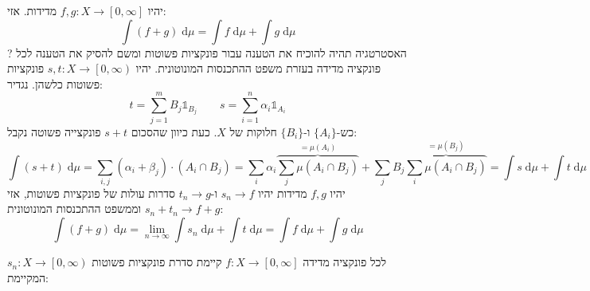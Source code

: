 \documentclass{tstextbook}
\begin{document}
\begin{lemma}
יהיו \(f,g:X\to\left[ 0,\infty \right]\) מדידות. אזי:
$$\int (f+g) \;\mathrm{d} \mu = \int f \;\mathrm{d} \mu+\int  g \;\mathrm{d} \mu   $$
?
האסטרטגיה תהיה להוכיח את הטענה עבור פונקציות פשוטות ומשם להסיק את הטענה לכל פונקציה מדידה בעזרת משפט ההתכנסות המונוטונית.
יהיו \(s,t :X\to \left[ 0,\infty \right)\) פונקציות פשוטות כלשהן. נגדיר:
$$t=\sum_{j=1}^{m} B_{j}\mathbb{1} _{B_{j}}\qquad s=\sum_{i=1}^{n} \alpha_{i}\mathbb{1} _{A_{i}}$$
כש-\(\{ A_{i} \}\) ו-\(\{ B_{i} \}\) חלוקות של \(X\). כעת כיוון שהסכום \(s+t\) פונקצייה פשוטה נקבל:
$$\int (s+t) \;\mathrm{d} \mu = \sum_{i,j} \left( \alpha_{i}+\beta_{j} \right)\cdot\left( A_{i}\cap B_{j} \right)=\sum_{i}\alpha_{i}\overbrace{ \sum_{j}\mu\left( A_{i}\cap B_{j} \right) }^{ =\mu(A_{i}) }  +\sum_{j}B_{j}\overbrace{ \sum_{i}\mu\left( A_{i}\cap B_{j} \right) }^{ =\mu(B_{j}) }=\int s \;\mathrm{d} \mu +\int t \;\mathrm{d} \mu $$
יהיו \(f,g\) מדידות יהיו \(s_{n}\to f\) ו-\(t_{n}\to g\) סדרות עולות של פונקציות פשוטות, אזי \(s_{n}+t_{n}\to f+g\) וממשפט ההתכנסות המונוטונית:
$$\int (f+g) \;\mathrm{d} \mu = \lim_{n\to \infty} \int  s_{n}\;\mathrm{d}\mu + \int t \;\mathrm{d} \mu =\int f \;\mathrm{d} \mu+\int g \;\mathrm{d} \mu  $$

\end{lemma}
לכל פונקציה מדידה \(f:X\to \left[ 0,\infty \right]\) קיימת סדרת פונקציות פשוטות \(s_{n}:X\to \left[ 0,\infty \right)\) המקיימת:
\end{document}
